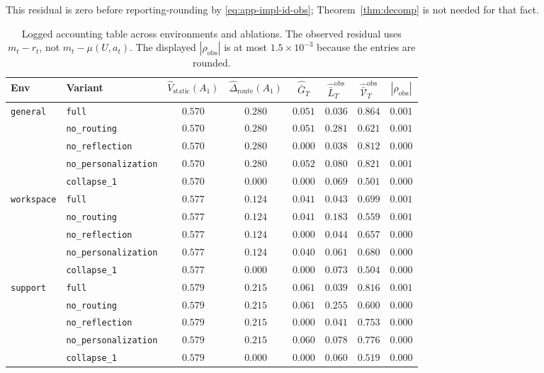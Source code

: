 \documentclass{article} %
\begin{document}
This residual is zero before reporting-rounding by
\eqref{eq:app-impl-id-obs}; Theorem~\ref{thm:decomp} is not needed for that
fact.

\begin{table}[h]
\centering
\small
\setlength{\tabcolsep}{4pt}
\begin{tabular}{llcccccc}
\toprule
Env & Variant & $\widehat V_{\mathrm{static}}(A_1)$ & $\widehat\Delta_{\mathrm{route}}(A_1)$ & $\widehat{\bar G}_T$ & $\widehat{\bar L}_T^{\mathrm{obs}}$ & $\widehat{\bar{\mathcal V}}_T^{\mathrm{obs}}$ & $|\rho_{\mathrm{obs}}|$ \\
\midrule
\multirow{5}{*}{\texttt{general}}
 & \texttt{full}                & $0.570$ & $0.280$ & $0.051$ & $0.036$ & $0.864$ & $0.001$ \\
 & \texttt{no\_routing}         & $0.570$ & $0.280$ & $0.051$ & $0.281$ & $0.621$ & $0.001$ \\
 & \texttt{no\_reflection}      & $0.570$ & $0.280$ & $0.000$ & $0.038$ & $0.812$ & $0.000$ \\
 & \texttt{no\_personalization} & $0.570$ & $0.280$ & $0.052$ & $0.080$ & $0.821$ & $0.001$ \\
 & \texttt{collapse\_1}         & $0.570$ & $0.000$ & $0.000$ & $0.069$ & $0.501$ & $0.000$ \\
\midrule
\multirow{5}{*}{\texttt{workspace}}
 & \texttt{full}                & $0.577$ & $0.124$ & $0.041$ & $0.043$ & $0.699$ & $0.001$ \\
 & \texttt{no\_routing}         & $0.577$ & $0.124$ & $0.041$ & $0.183$ & $0.559$ & $0.001$ \\
 & \texttt{no\_reflection}      & $0.577$ & $0.124$ & $0.000$ & $0.044$ & $0.657$ & $0.000$ \\
 & \texttt{no\_personalization} & $0.577$ & $0.124$ & $0.040$ & $0.061$ & $0.680$ & $0.000$ \\
 & \texttt{collapse\_1}         & $0.577$ & $0.000$ & $0.000$ & $0.073$ & $0.504$ & $0.000$ \\
\midrule
\multirow{5}{*}{\texttt{support}}
 & \texttt{full}                & $0.579$ & $0.215$ & $0.061$ & $0.039$ & $0.816$ & $0.001$ \\
 & \texttt{no\_routing}         & $0.579$ & $0.215$ & $0.061$ & $0.255$ & $0.600$ & $0.000$ \\
 & \texttt{no\_reflection}      & $0.579$ & $0.215$ & $0.000$ & $0.041$ & $0.753$ & $0.000$ \\
 & \texttt{no\_personalization} & $0.579$ & $0.215$ & $0.060$ & $0.078$ & $0.776$ & $0.000$ \\
 & \texttt{collapse\_1}         & $0.579$ & $0.000$ & $0.000$ & $0.060$ & $0.519$ & $0.000$ \\
\bottomrule
\end{tabular}
\caption{Logged accounting table across environments and ablations. The
observed residual uses \(m_t-r_t\), not \(m_t-\mu(U,a_t)\). The displayed
\(|\rho_{\mathrm{obs}}|\) is at most \(1.5\times10^{-3}\) because the entries
are rounded.}
\label{tab:app-decomp-full}
\end{table}
\end{document}
